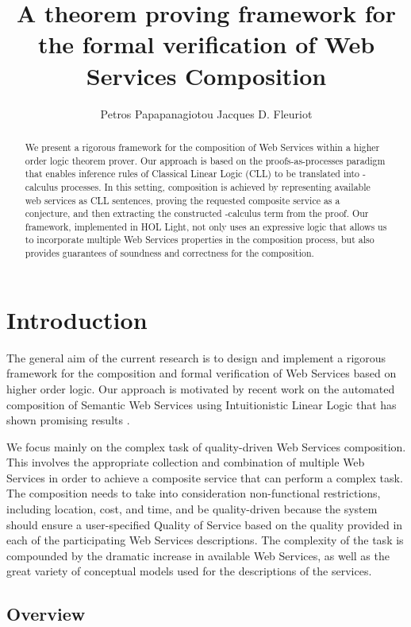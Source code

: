 \documentclass[copyright,creativecommons]{eptcs}
\title{A theorem proving framework for the formal verification of Web Services Composition}
\author{Petros Papapanagiotou \qquad\qquad Jacques D. Fleuriot
\institute{School of Informatics\\
University of Edinburgh \\
Informatics Forum, 10 Crichton Street\\
Edinburgh EH8 9AB, UK}
\email{P.Papapanagiotou@sms.ed.ac.uk \quad\qquad jdf@inf.ed.ac.uk}
}
\begin{document}
\maketitle


\begin{abstract}
We present a rigorous framework for the composition of Web Services within a higher order logic theorem prover. Our approach is based on the proofs-as-processes paradigm that enables inference rules of Classical Linear Logic (CLL) to be translated into -calculus processes. In this setting, composition is achieved by representing available web services as CLL sentences, proving the requested composite service as a conjecture, and then extracting the constructed -calculus term from the proof. Our framework, implemented in HOL Light, not only uses an expressive logic that allows us to incorporate multiple Web Services properties in the composition process, but also provides guarantees of soundness and correctness for the composition. 
\end{abstract}

\section{Introduction}
\label{intro}

The general aim of the current research is to design and implement a rigorous framework for the composition and formal verification of Web Services based on higher order logic. Our approach is motivated by recent work on the automated composition of Semantic Web Services using Intuitionistic Linear Logic that has shown promising results \cite{rao-semantic,rao2006composition}.

We focus mainly on the complex task of quality-driven Web Services composition. This involves the appropriate collection and combination of multiple Web Services in order to achieve a composite service that can perform a complex task. The composition needs to take into consideration non-functional restrictions, including location, cost, and time, and be quality-driven because the system should ensure a user-specified Quality of Service based on the quality provided in each of the participating Web Services descriptions. The complexity of the task is compounded by the dramatic increase in available Web Services, as well as the great variety of conceptual models used for the descriptions of the services. 

\subsection{Overview}
\label{overview}
\end{document}
